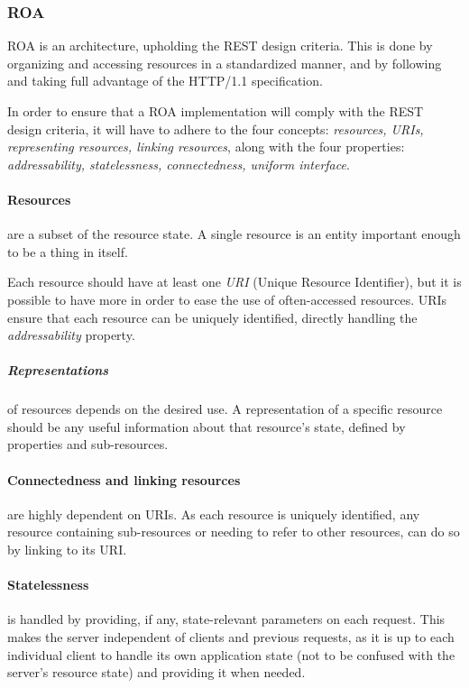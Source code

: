 \subsubsection{ROA}
ROA is an architecture, upholding the REST design criteria.
This is done by organizing and accessing resources in a standardized manner, and by following and taking full advantage of the HTTP/1.1 specification.

In order to ensure that a ROA implementation will comply with the REST design criteria, it will have to adhere to the four concepts: \textit{resources, URIs, representing resources, linking resources}, along with the four properties: \textit{addressability, statelessness, connectedness, uniform interface}.\cite[Chapter 4]{restful_web_services}

\paragraph{Resources} are a subset of the resource state.
A single resource is an entity important enough to be a thing in itself.

Each resource should have at least one \textit{URI} (Unique Resource Identifier), but it is possible to have more in order to ease the use of often-accessed resources.
URIs ensure that each resource can be uniquely identified, directly handling the \textit{addressability} property.

\subparagraph{Representations} of resources depends on the desired use.
A representation of a specific resource should be any useful information about that resource's state, defined by properties and sub-resources.

\paragraph{Connectedness and linking resources} are highly dependent on URIs.
As each resource is uniquely identified, any resource containing sub-resources or needing to refer to other resources, can do so by linking to its URI. 

\paragraph{Statelessness} is handled by providing, if any, state-relevant parameters on each request.
This makes the server independent of clients and previous requests, as it is up to each individual client to handle its own application state (not to be confused with the server's resource state) and providing it when needed.

